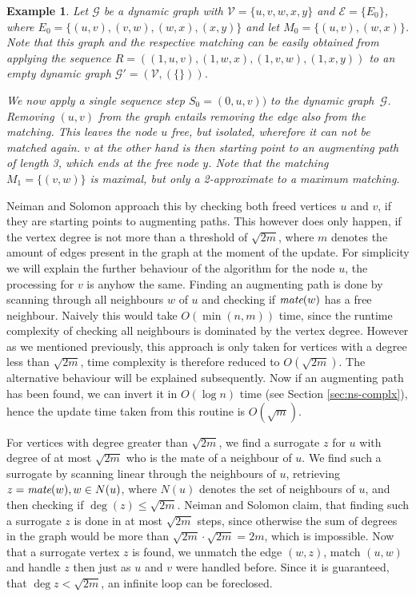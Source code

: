 \documentclass{article}      %
\newtheorem{example}{Example}[subsection]
\DeclareMathOperator\mate{\emph{mate}}
\begin{document}
\begin{example}
\label{ex:rise-aug-path}
Let $\mathcal{G}$ be a dynamic graph with $\mathcal{V}=\{u,v,w,x,y\}$ and $\mathcal{E}=\{E_0\}$, where $E_0=\{(u,v),(v,w),(w,x),(x,y)\}$ and let $M_0=\{(u,v),(w,x)\}$. Note that this graph and the respective matching can be easily obtained from applying the sequence $ R=((1,u,v),(1,w,x),(1,v,w),(1,x,y)) $ to an empty dynamic graph $\mathcal{G'}=(\mathcal{V},(\{\}))$. 

We now apply a single sequence step $S_0 = (0,u,v))$ to the dynamic graph~$\mathcal{G}$. Removing $(u,v)$ from the graph entails removing the edge also from the matching. This leaves the node $u$ free, but isolated, wherefore it can not be matched again. $v$ at the other hand is then starting point to an augmenting path of length 3, which ends at the free node $y$. Note that the matching $M_1=\{(v,w)\}$ is maximal, but only a 2-approximate to a maximum matching.
\end{example}

\noindent
Neiman and Solomon approach this by checking both freed vertices $u$ and $v$, if they are starting points to augmenting paths. This however does only happen, if the vertex degree is not more than a threshold of $\sqrt{2m}$, where $m$ denotes the amount of edges present in the graph at the moment of the update. For simplicity we will explain the further behaviour of the algorithm for the node $u$, the processing for $v$ is anyhow the same. Finding an augmenting path is done by scanning through all neighbours $w$ of $u$ and checking if $\mate(w)$ has a free neighbour. Naively this would take $O(\min(n,m))$ time, since the runtime complexity of checking all neighbours is dominated by the vertex degree. However as we mentioned previously, this approach is only taken for vertices with a degree less than $\sqrt{2m}$, time complexity is therefore reduced to $O(\sqrt{2m})$. The alternative behaviour will be explained subsequently. Now if an augmenting path has been found, we can invert it in $O(\log n)$ time (see Section \ref{sec:ns-complx}), hence the update time taken from this routine is $O(\sqrt{m})$.

For vertices with degree greater than $\sqrt{2m}$, we find a surrogate $z$ for $u$ with degree of at most $\sqrt{2m}$ who is the mate of a neighbour of $u$. We find such a surrogate by scanning linear through the neighbours of $u$, retrieving $z=\mate(w), w \in N(u)$, where $N(u)$ denotes the set of neighbours of $u$, and then checking if $\deg(z)\leq\sqrt{2m}$. Neiman and Solomon claim, that finding such a surrogate $z$ is done in at most $\sqrt{2m}$ steps, since otherwise the sum of degrees in the graph would be more than $\sqrt{2m} \cdot \sqrt{2m} = 2m$, which is impossible. Now that a surrogate vertex $z$ is found, we unmatch the edge $(w,z)$, match $(u,w)$ and handle $z$ then just as $u$ and $v$ were handled before. Since it is guaranteed, that $\deg{z}<\sqrt{2m}$, an infinite loop can be foreclosed.
\end{document}
